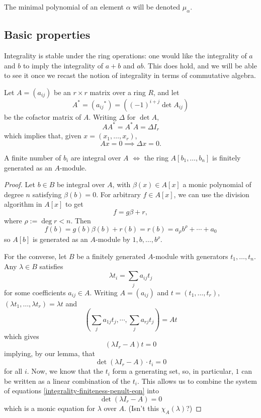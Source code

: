 \begin{definition}
  The minimal polynomial of an element $\alpha$ will be denoted $\mu_\alpha$.
\end{definition}

\subsection{Basic properties}

Integrality is stable under the ring operations: one would like the integrality
of $a$ and $b$ to imply the integrality of $a + b$ and $ab$. This does hold,
and we will be able to see it once we recast the notion of integrality in terms
of commutative algebra.

\begin{lemma}
  Let $A = (a_{ij})$ be an $r\times r$ matrix over a ring $R$, and let \[A^\ast
  = ({a_{ij}}^\ast) = ((-1)^{i+j} \det A_{ij})\] be the cofactor matrix of $A$.
  Writing $\Delta$ for $\det A$, \[A{A^\ast} = {A^\ast}A = \Delta I_r \] which
  implies that, given $x = (x_1,\ldots,x_r)$, \[Ax = 0 \implies \Delta x = 0.\]
\end{lemma}

\begin{theorem}{\label{module-integrality}}
  A finite number of $b_i$ are integral over $A$ $\iff$ the ring
  $A[b_1,\ldots,b_n]$ is finitely generated as an $A$-module.
\end{theorem}
\begin{proof}
  Let $b\in B$ be integral over $A$, with $\beta(x) \in A[x]$ a monic
  polynomial of degree $n$ satisfying $\beta(b) = 0$. For arbitrary $f\in
  A[x]$, we can use the division algorithm in $A[x]$ to get \[f = g\beta + r,\]
  where $\rho := \deg r < n$.  Then \[f(b) = g(b)\beta(b) + r(b) = r(b) =
  a_\rho b^\rho + \cdots + a_0\] so $A[b]$ is generated as an $A$-module by $1,
  b, \ldots, b^\rho$.

  \medskip\noindent For the converse, let $B$ be a finitely generated
  $A$-module with generators $t_1,\ldots,t_n$. Any $\lambda \in B$ satisfies \[
  \lambda t_i = \sum_j a_{ij} t_j \] for some coefficients $a_{ij} \in A$.
  Writing $A = (a_{ij})$ and $t = (t_1,\ldots,t_r)$, $(\lambda
  t_1,\ldots,\lambda t_r) = \lambda t$ and \[ \left( \sum_j a_{1j} t_j, \cdots,
  \sum_j a_{rj} t_j \right) = At \]
  which gives
  \[ (\lambda I_r - A)t = 0 \]
  implying, by our lemma, that
  \begin{equation}%
    \label{integrality-finiteness-penult-eqn}
    \det(\lambda I_r - A) \cdot t_i = 0 
  \end{equation}
  for all $i$. Now, we know that the $t_i$ form a generating set, so, in
  particular, $1$ can be written as a linear combination of the $t_i$. This
  allows us to combine the system of equations
  \ref{integrality-finiteness-penult-eqn} into \[\det(\lambda I_r - A) = 0 \]
  which is a monic equation for $\lambda$ over $A$. (Isn't this $\chi_A(\lambda)$?)
\end{proof}

